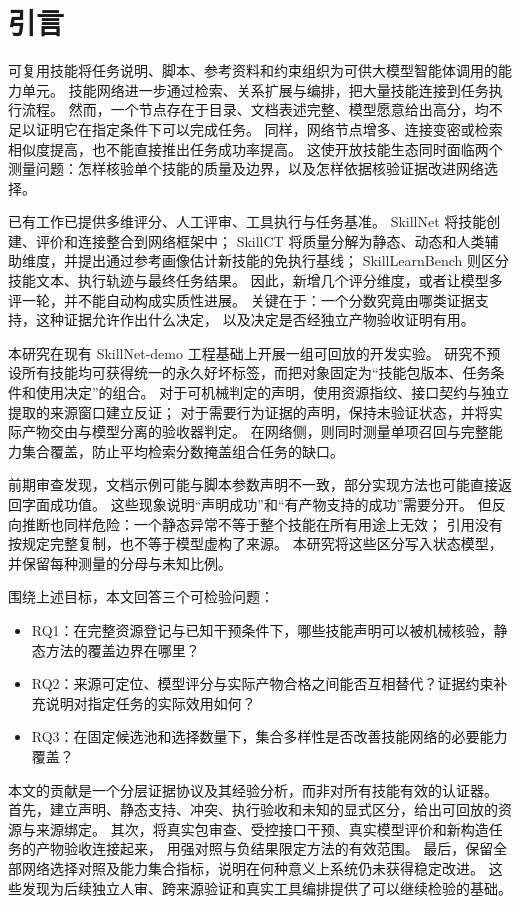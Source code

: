 \section{引言}
可复用技能将任务说明、脚本、参考资料和约束组织为可供大模型智能体调用的能力单元。
技能网络进一步通过检索、关系扩展与编排，把大量技能连接到任务执行流程。
然而，一个节点存在于目录、文档表述完整、模型愿意给出高分，均不足以证明它在指定条件下可以完成任务。
同样，网络节点增多、连接变密或检索相似度提高，也不能直接推出任务成功率提高。
这使开放技能生态同时面临两个测量问题：怎样核验单个技能的质量及边界，以及怎样依据核验证据改进网络选择。

已有工作已提供多维评分、人工评审、工具执行与任务基准。
SkillNet 将技能创建、评价和连接整合到网络框架中\citep{P01}；
SkillCT 将质量分解为静态、动态和人类辅助维度，并提出通过参考画像估计新技能的免执行基线\citep{P43}；
SkillLearnBench 则区分技能文本、执行轨迹与最终任务结果\citep{P44}。
因此，新增几个评分维度，或者让模型多评一轮，并不能自动构成实质性进展。
关键在于：一个分数究竟由哪类证据支持，这种证据允许作出什么决定，
以及决定是否经独立产物验收证明有用。

本研究在现有 SkillNet-demo 工程基础上开展一组可回放的开发实验。
研究不预设所有技能均可获得统一的永久好坏标签，而把对象固定为“技能包版本、任务条件和使用决定”的组合。
对于可机械判定的声明，使用资源指纹、接口契约与独立提取的来源窗口建立反证；
对于需要行为证据的声明，保持未验证状态，并将实际产物交由与模型分离的验收器判定。
在网络侧，则同时测量单项召回与完整能力集合覆盖，防止平均检索分数掩盖组合任务的缺口。

前期审查发现，文档示例可能与脚本参数声明不一致，部分实现方法也可能直接返回字面成功值。
这些现象说明“声明成功”和“有产物支持的成功”需要分开。
但反向推断也同样危险：一个静态异常不等于整个技能在所有用途上无效；
引用没有按规定完整复制，也不等于模型虚构了来源。
本研究将这些区分写入状态模型，并保留每种测量的分母与未知比例。

围绕上述目标，本文回答三个可检验问题：
\begin{itemize}
\item RQ1：在完整资源登记与已知干预条件下，哪些技能声明可以被机械核验，静态方法的覆盖边界在哪里？
\item RQ2：来源可定位、模型评分与实际产物合格之间能否互相替代？证据约束补充说明对指定任务的实际效用如何？
\item RQ3：在固定候选池和选择数量下，集合多样性是否改善技能网络的必要能力覆盖？
\end{itemize}

本文的贡献是一个分层证据协议及其经验分析，而非对所有技能有效的认证器。
首先，建立声明、静态支持、冲突、执行验收和未知的显式区分，给出可回放的资源与来源绑定。
其次，将真实包审查、受控接口干预、真实模型评价和新构造任务的产物验收连接起来，
用强对照与负结果限定方法的有效范围。
最后，保留全部网络选择对照及能力集合指标，说明在何种意义上系统仍未获得稳定改进。
这些发现为后续独立人审、跨来源验证和真实工具编排提供了可以继续检验的基础。
